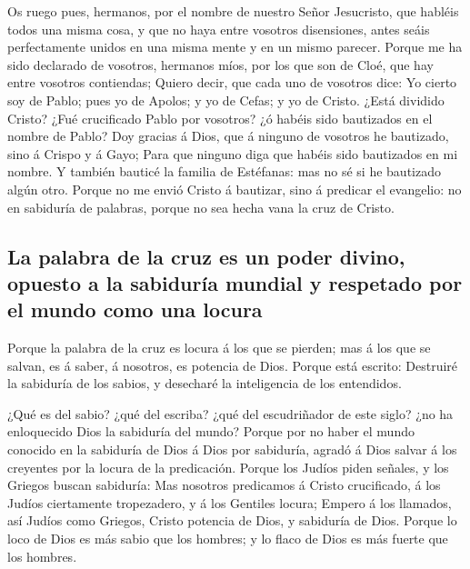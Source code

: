  Os ruego pues, hermanos, por el nombre de nuestro Señor
Jesucristo, que habléis todos una misma cosa, y que no haya entre
vosotros disensiones, antes seáis perfectamente unidos en una misma
mente y en un mismo parecer.  Porque me ha sido declarado
de vosotros, hermanos míos, por los que son de Cloé, que hay entre
vosotros contiendas;  Quiero decir, que cada uno de
vosotros dice: Yo cierto soy de Pablo; pues yo de Apolos; y yo de Cefas;
y yo de Cristo.  ¿Está dividido Cristo? ¿Fué crucificado
Pablo por vosotros? ¿ó habéis sido bautizados en el nombre de Pablo?
 Doy gracias á Dios, que á ninguno de vosotros he
bautizado, sino á Crispo y á Gayo;  Para que ninguno diga
que habéis sido bautizados en mi nombre.  Y también
bauticé la familia de Estéfanas: mas no sé si he bautizado algún otro.
 Porque no me envió Cristo á bautizar, sino á predicar el
evangelio: no en sabiduría de palabras, porque no sea hecha vana la cruz
de Cristo.

\hypertarget{la-palabra-de-la-cruz-es-un-poder-divino-opuesto-a-la-sabiduruxeda-mundial-y-respetado-por-el-mundo-como-una-locura}{%
\subsection{La palabra de la cruz es un poder divino, opuesto a la
sabiduría mundial y respetado por el mundo como una
locura}\label{la-palabra-de-la-cruz-es-un-poder-divino-opuesto-a-la-sabiduruxeda-mundial-y-respetado-por-el-mundo-como-una-locura}}

 Porque la palabra de la cruz es locura á los que se
pierden; mas á los que se salvan, es á saber, á nosotros, es potencia de
Dios.  Porque está escrito: Destruiré la sabiduría de los
sabios, y desecharé la inteligencia de los entendidos.

 ¿Qué es del sabio? ¿qué del escriba? ¿qué del
escudriñador de este siglo? ¿no ha enloquecido Dios la sabiduría del
mundo?  Porque por no haber el mundo conocido en la
sabiduría de Dios á Dios por sabiduría, agradó á Dios salvar á los
creyentes por la locura de la predicación.  Porque los
Judíos piden señales, y los Griegos buscan sabiduría: 
Mas nosotros predicamos á Cristo crucificado, á los Judíos ciertamente
tropezadero, y á los Gentiles locura;  Empero á los
llamados, así Judíos como Griegos, Cristo potencia de Dios, y sabiduría
de Dios.  Porque lo loco de Dios es más sabio que los
hombres; y lo flaco de Dios es más fuerte que los hombres.

